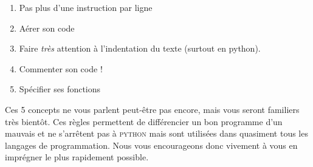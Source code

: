 \begin{enumerate}
    \item Pas plus d'une instruction par ligne
    \item Aérer son code
    \item Faire \emph{très} attention à l'indentation du texte (surtout en python). 
    \item Commenter son code !
    \item Spécifier ses fonctions
\end{enumerate}
Ces 5 concepts ne vous parlent peut-être pas encore, mais vous seront familiers très bientôt. Ces règles permettent de différencier un bon programme d'un mauvais et ne s'arrêtent pas à \textsc{python} mais sont utilisées dans quasiment tous les langages de programmation. Nous vous encourageons donc vivement à vous en imprégner le plus rapidement possible.